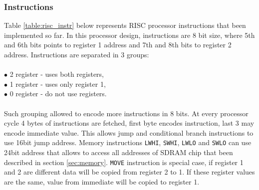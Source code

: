 \documentclass[a4paper,12pt]{article}
\begin{document}
\begin{multicols}{2}
\subsubsection{Instructions}\label{sec:instr}
Table \ref{table:risc_instr} below represents RISC processor instructions that been implemented so far. In this processor design, instructions are 8 bit size, where 5th and 6th bits points to register 1 address and 7th and 8th bits to register 2 address. Instructions are separated in 3 groups:\\\\
$\bullet$ 2 register - uses both registers,\\
$\bullet$ 1 register - uses only register 1,\\
$\bullet$ 0 register - do not use registers.\\\\
Such grouping allowed to encode more instructions in 8 bits. At every processor cycle 4 bytes of instructions are fetched, first byte encodes instruction, last 3 may encode immediate value. This allows jump and conditional branch instructions to use 16bit jump address. Memory instructions \texttt{LWHI}, \texttt{SWHI},  \texttt{LWLO} and \texttt{SWLO} can use 24bit address that allows to access all   addresses of SDRAM chip that been described in section \ref{sec:memory}. \texttt{MOVE} instruction is special case, if register 1 and 2 are different data will be copied from register 2 to 1. If these register values are the same, value from immediate will be copied to register 1.

\end{multicols}
\end{document}
